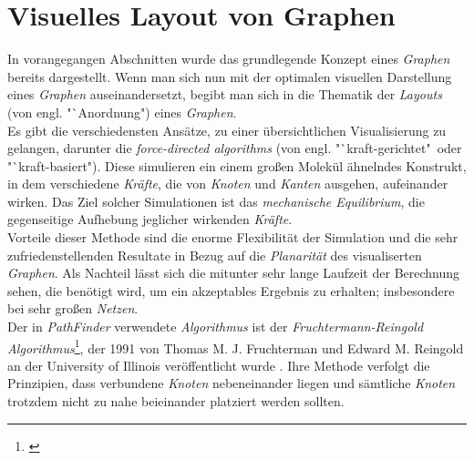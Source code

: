 \documentclass[12pt]{article}
\begin{document}
\section{Visuelles Layout von Graphen}
\label{sec:layout}
In vorangegangen Abschnitten wurde das grundlegende Konzept eines \textit{Graphen} bereits dargestellt. Wenn man sich nun mit der optimalen visuellen Darstellung eines \textit{Graphen} auseinandersetzt, begibt man sich in die Thematik der \textit{Layouts} (von engl. "`Anordnung") eines \textit{Graphen}.
\\ 
Es gibt die verschiedensten Ansätze, zu einer übersichtlichen Visualisierung zu gelangen, darunter die \textit{force-directed algorithms} (von engl. "`kraft-gerichtet"\ oder "`kraft-basiert")\cite{force-directed}. Diese simulieren ein einem großen Molekül ähnelndes Konstrukt, in dem verschiedene \textit{Kräfte}, die von \textit{Knoten} und \textit{Kanten} ausgehen, aufeinander wirken. Das Ziel solcher Simulationen ist das \textit{mechanische Equilibrium}, die gegenseitige Aufhebung jeglicher wirkenden \textit{Kräfte}.\\
Vorteile dieser Methode sind die enorme Flexibilität der Simulation und die sehr zufriedenstellenden Resultate in Bezug auf die \textit{Planarität} des visualiserten \textit{Graphen}. Als Nachteil lässt sich die mitunter sehr lange Laufzeit der Berechnung sehen, die benötigt wird, um ein akzeptables Ergebnis zu erhalten; insbesondere bei sehr großen \textit{Netzen}.
\\
Der in \textit{PathFinder} verwendete \textit{Algorithmus} ist der \textit{Fruchtermann-Reingold Algorithmus}\footnote{\cite[Kapitel 12.3, S. 386f]{force-directed2}}, der 1991 von Thomas M. J. Fruchterman und Edward M. Reingold an der University of Illinois veröffentlicht wurde \cite{fruchterman}. Ihre Methode verfolgt die Prinzipien, dass verbundene \textit{Knoten} nebeneinander liegen und sämtliche \textit{Knoten} trotzdem nicht zu nahe beieinander platziert werden sollten.
\end{document}
